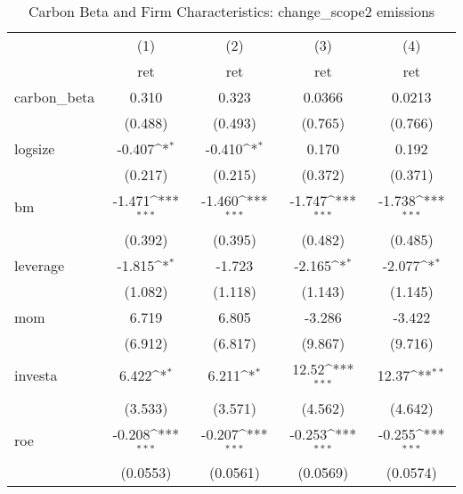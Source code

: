 \begin{table}[htbp]\centering
\def\sym#1{\ifmmode^{#1}\else\(^{#1}\)\fi}
\caption{Carbon Beta and Firm Characteristics: change\_scope2 emissions}
\begin{tabular}{l*{4}{c}}
\hline\hline
                    &\multicolumn{1}{c}{(1)}&\multicolumn{1}{c}{(2)}&\multicolumn{1}{c}{(3)}&\multicolumn{1}{c}{(4)}\\
                    &\multicolumn{1}{c}{ret}&\multicolumn{1}{c}{ret}&\multicolumn{1}{c}{ret}&\multicolumn{1}{c}{ret}\\
\hline
carbon\_beta         &       0.310         &       0.323         &      0.0366         &      0.0213         \\
                    &     (0.488)         &     (0.493)         &     (0.765)         &     (0.766)         \\
[1em]
logsize             &      -0.407\sym{*}  &      -0.410\sym{*}  &       0.170         &       0.192         \\
                    &     (0.217)         &     (0.215)         &     (0.372)         &     (0.371)         \\
[1em]
bm                  &      -1.471\sym{***}&      -1.460\sym{***}&      -1.747\sym{***}&      -1.738\sym{***}\\
                    &     (0.392)         &     (0.395)         &     (0.482)         &     (0.485)         \\
[1em]
leverage            &      -1.815\sym{*}  &      -1.723         &      -2.165\sym{*}  &      -2.077\sym{*}  \\
                    &     (1.082)         &     (1.118)         &     (1.143)         &     (1.145)         \\
[1em]
mom                 &       6.719         &       6.805         &      -3.286         &      -3.422         \\
                    &     (6.912)         &     (6.817)         &     (9.867)         &     (9.716)         \\
[1em]
investa             &       6.422\sym{*}  &       6.211\sym{*}  &       12.52\sym{***}&       12.37\sym{**} \\
                    &     (3.533)         &     (3.571)         &     (4.562)         &     (4.642)         \\
[1em]
roe                 &      -0.208\sym{***}&      -0.207\sym{***}&      -0.253\sym{***}&      -0.255\sym{***}\\
                    &    (0.0553)         &    (0.0561)         &    (0.0569)         &    (0.0574)         \\

\end{tabular}
\end{table}
